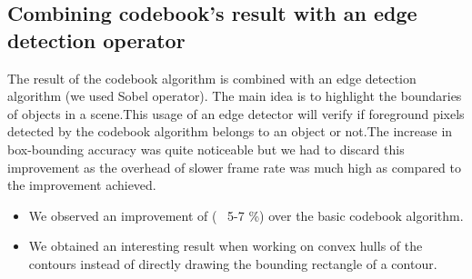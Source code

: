 \documentclass[12pt,a4paper]{report}
\begin{document}
\subsection*{Combining codebook's result with an edge detection operator}
The result of the codebook algorithm is combined with an edge detection algorithm (we used Sobel operator).
The main idea is to highlight the boundaries of objects in a scene.This usage of an edge detector will verify if foreground pixels detected by the codebook algorithm belongs to an object or not.The increase in box-bounding accuracy was quite noticeable but we had to discard this improvement as the overhead of slower frame rate was much high as compared to the improvement achieved. 
\begin{itemize}
\item We observed an improvement of (~ 5-7 \%) over the basic codebook algorithm.
\item We obtained an interesting result when working on convex hulls of the contours instead of directly drawing the bounding rectangle of a contour.
\end{itemize}
\end{document}
